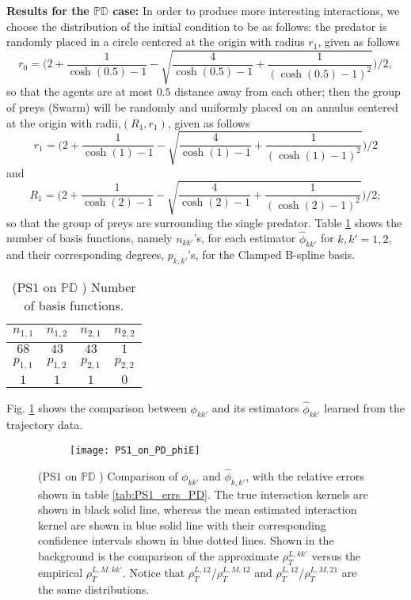 \documentclass[11pt]{article}
\newcommand{\idxcl}{k}
\newcommand{\intkernel}{\phi}
\newcommand{\lintkernel}{\widehat{\intkernel}}
\begin{document}
\textbf{Results for the  $ \mathbb{PD} $  case:} In order to produce more interesting interactions, we choose the distribution of the initial condition to be as follows: the predator is randomly placed in a circle centered at the origin with radius $r_1$, given as follows
\[
r_0 = \bigg(2 + \frac{1}{\cosh(0.5) - 1} - \sqrt{\frac{4}{\cosh(0.5) - 1} + \frac{1}{(\cosh(0.5) - 1)^2}}\bigg)/2,
\]
so that the agents are at most $0.5$ distance away from each other; then the group of preys (Swarm) will be randomly and uniformly placed on an annulus centered at the origin with radii,$(R_1, r_1)$, given as follows
\[
r_1 = \bigg(2 + \frac{1}{\cosh(1) - 1} - \sqrt{\frac{4}{\cosh(1) - 1} + \frac{1}{(\cosh(1) - 1)^2}}\bigg)/2
\]
and
\[
R_1 = \bigg(2 + \frac{1}{\cosh(2) - 1} - \sqrt{\frac{4}{\cosh(2) - 1} + \frac{1}{(\cosh(2) - 1)^2}}\bigg)/2;
\]
so that the group of preys are surrounding the single predator.  Table \ref{tab:PS1_ns_PD} shows the number of basis functions, namely $n_{\idxcl\idxcl'}$'s, for each estimator $\lintkernel_{\idxcl\idxcl'}$ for $\idxcl, \idxcl' = 1, 2$, and their corresponding degrees, $p_{\idxcl, \idxcl'}$'s, for the Clamped B-spline basis.
\begin{table}[H]
\centering
\small{
\small{\begin{tabular}{ c | c | c | c}
$n_{1, 1}$ & $n_{1, 2}$ & $n_{2, 1}$ & $n_{2, 2}$ \\
\hline
$68$       & $43$       & $43$       & $1$ \\
\hline
$p_{1, 1}$ & $p_{1, 2}$ & $p_{2, 1}$ & $p_{2, 2}$ \\
\hline
$1$        & $1$        & $1$        & $0$ \\
\hline
\end{tabular}}  
}
\caption{(PS$1$ on  $ \mathbb{PD} $ ) Number of basis functions.}
\label{tab:PS1_ns_PD} 
\end{table}
Fig. \ref{fig:PS1_on_PD_phiE} shows the comparison between $\intkernel_{\idxcl\idxcl'}$ and its estimators $\lintkernel_{\idxcl\idxcl'}$ learned from the trajectory data.
\begin{figure}[H]  
\begin{subfigure}{\textwidth}
  \centering
  \texttt{[image: PS1\_on\_PD\_phiE]}
\end{subfigure}
\caption{(PS$1$ on  $ \mathbb{PD} $ ) Comparison of $\intkernel_{\idxcl\idxcl'}$ and $\lintkernel_{\idxcl, \idxcl'}$, with the relative errors shown in table \ref{tab:PS1_errs_PD}. The true interaction kernels are shown in black solid line, whereas the mean estimated interaction kernel are shown in blue solid line with their corresponding confidence intervals shown in blue dotted lines.  Shown in the background is the comparison of the approximate $\rho_T^{L, \idxcl\idxcl'}$ versus the empirical $\rho_T^{L, M, \idxcl\idxcl'}$. Notice that $\rho_T^{L, 12}$/$\rho_T^{L, M, 12}$ and $\rho_T^{L, 12}$/$\rho_T^{L, M, 21}$ are the same distributions.}
\label{fig:PS1_on_PD_phiE}
\end{figure}
\end{document}
